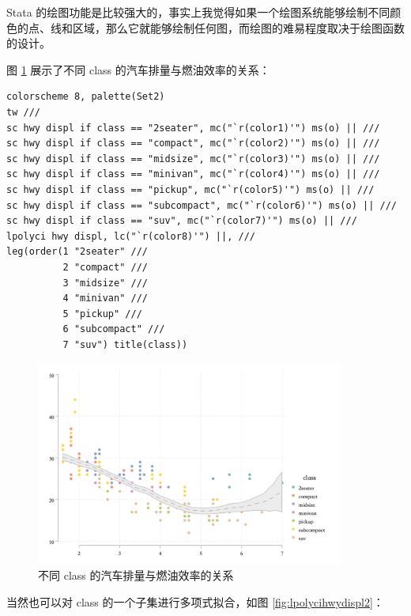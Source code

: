 \documentclass[]{ctexbook}
\begin{document}
Stata 的绘图功能是比较强大的，事实上我觉得如果一个绘图系统能够绘制不同颜色的点、线和区域，那么它就能够绘制任何图，而绘图的难易程度取决于绘图函数的设计。

图 \ref{fig:lpolycihwydispl} 展示了不同 class 的汽车排量与燃油效率的关系：

\begin{lstlisting}
colorscheme 8, palette(Set2)
tw ///
sc hwy displ if class == "2seater", mc("`r(color1)'") ms(o) || ///
sc hwy displ if class == "compact", mc("`r(color2)'") ms(o) || ///
sc hwy displ if class == "midsize", mc("`r(color3)'") ms(o) || ///
sc hwy displ if class == "minivan", mc("`r(color4)'") ms(o) || ///
sc hwy displ if class == "pickup", mc("`r(color5)'") ms(o) || ///
sc hwy displ if class == "subcompact", mc("`r(color6)'") ms(o) || ///
sc hwy displ if class == "suv", mc("`r(color7)'") ms(o) || ///
lpolyci hwy displ, lc("`r(color8)'") ||, ///
leg(order(1 "2seater" ///
          2 "compact" ///
          3 "midsize" ///
          4 "minivan" ///
          5 "pickup" ///
          6 "subcompact" ///
          7 "suv") title(class))
\end{lstlisting}

\begin{figure}

{\centering \includegraphics[width=0.9\textwidth]{assets/lpolycihwydispl} 

}

\caption{不同 class 的汽车排量与燃油效率的关系}\label{fig:lpolycihwydispl}
\end{figure}

当然也可以对 class 的一个子集进行多项式拟合，如图 \ref{fig:lpolycihwydispl2}：
\end{document}
